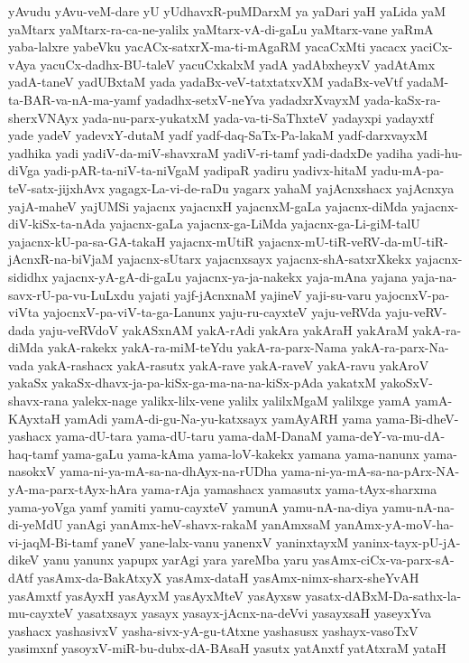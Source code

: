 {yAvudu
yAvu-veM-dare
yU
yUdhavxR-puMDarxM
ya
yaDari
yaH
yaLida
yaM
yaMtarx
yaMtarx-ra-ca-ne-yalilx
yaMtarx-vA-di-gaLu
yaMtarx-vane
yaRmA
yaba-lalxre
yabeVku
yacACx-satxrX-ma-ti-mAgaRM
yacaCxMti
yacacx
yaciCx-vAya
yacuCx-dadhx-BU-taleV
yacuCxkalxM
yadA
yadAbxheyxV
yadAtAmx
yadA-taneV
yadUBxtaM
yada
yadaBx-veV-tatxtatxvXM
yadaBx-veVtf
yadaM-ta-BAR-va-nA-ma-yamf
yadadhx-setxV-neYva
yadadxrXvayxM
yada-kaSx-ra-sherxVNAyx
yada-nu-parx-yukatxM
yada-va-ti-SaThxteV
yadayxpi
yadayxtf
yade
yadeV
yadevxY-dutaM
yadf
yadf-daq-SaTx-Pa-lakaM
yadf-darxvayxM
yadhika
yadi
yadiV-da-miV-shavxraM
yadiV-ri-tamf
yadi-dadxDe
yadiha
yadi-hu-diVga
yadi-pAR-ta-niV-ta-niVgaM
yadipaR
yadiru
yadivx-hitaM
yadu-mA-pa-teV-satx-jijxhAvx
yagagx-La-vi-de-raDu
yagarx
yahaM
yajAcnxshacx
yajAcnxya
yajA-maheV
yajUMSi
yajacnx
yajacnxH
yajacnxM-gaLa
yajacnx-diMda
yajacnx-diV-kiSx-ta-nAda
yajacnx-gaLa
yajacnx-ga-LiMda
yajacnx-ga-Li-giM-talU
yajacnx-kU-pa-sa-GA-takaH
yajacnx-mUtiR
yajacnx-mU-tiR-veRV-da-mU-tiR-jAcnxR-na-biVjaM
yajacnx-sUtarx
yajacnxsayx
yajacnx-shA-satxrXkekx
yajacnx-sididhx
yajacnx-yA-gA-di-gaLu
yajacnx-ya-ja-nakekx
yaja-mAna
yajana
yaja-na-savx-rU-pa-vu-LuLxdu
yajati
yajf-jAcnxnaM
yajineV
yaji-su-varu
yajocnxV-pa-viVta
yajocnxV-pa-viV-ta-ga-Lanunx
yaju-ru-cayxteV
yaju-veRVda
yaju-veRV-dada
yaju-veRVdoV
yakASxnAM
yakA-rAdi
yakAra
yakAraH
yakAraM
yakA-ra-diMda
yakA-rakekx
yakA-ra-miM-teYdu
yakA-ra-parx-Nama
yakA-ra-parx-Na-vada
yakA-rashacx
yakA-rasutx
yakA-rave
yakA-raveV
yakA-ravu
yakAroV
yakaSx
yakaSx-dhavx-ja-pa-kiSx-ga-ma-na-na-kiSx-pAda
yakatxM
yakoSxV-shavx-rana
yalekx-nage
yalikx-lilx-vene
yalilx
yalilxMgaM
yalilxge
yamA
yamA-KAyxtaH
yamAdi
yamA-di-gu-Na-yu-katxsayx
yamAyARH
yama
yama-Bi-dheV-yashacx
yama-dU-tara
yama-dU-taru
yama-daM-DanaM
yama-deY-va-mu-dA-haq-tamf
yama-gaLu
yama-kAma
yama-loV-kakekx
yamana
yama-nanunx
yama-nasokxV
yama-ni-ya-mA-sa-na-dhAyx-na-rUDha
yama-ni-ya-mA-sa-na-pArx-NA-yA-ma-parx-tAyx-hAra
yama-rAja
yamashacx
yamasutx
yama-tAyx-sharxma
yama-yoVga
yamf
yamiti
yamu-cayxteV
yamunA
yamu-nA-na-diya
yamu-nA-na-di-yeMdU
yanAgi
yanAmx-heV-shavx-rakaM
yanAmxsaM
yanAmx-yA-moV-ha-vi-jaqM-Bi-tamf
yaneV
yane-lalx-vanu
yanenxV
yaninxtayxM
yaninx-tayx-pU-jA-dikeV
yanu
yanunx
yapupx
yarAgi
yara
yareMba
yaru
yasAmx-ciCx-va-parx-sA-dAtf
yasAmx-da-BakAtxyX
yasAmx-dataH
yasAmx-nimx-sharx-sheYvAH
yasAmxtf
yasAyxH
yasAyxM
yasAyxMteV
yasAyxsw
yasatx-dABxM-Da-sathx-la-mu-cayxteV
yasatxsayx
yasayx
yasayx-jAcnx-na-deVvi
yasayxsaH
yaseyxYva
yashacx
yashasivxV
yasha-sivx-yA-gu-tAtxne
yashasusx
yashayx-vasoTxV
yasimxnf
yasoyxV-miR-bu-dubx-dA-BAsaH
yasutx
yatAnxtf
yatAtxraM
yataH
}

